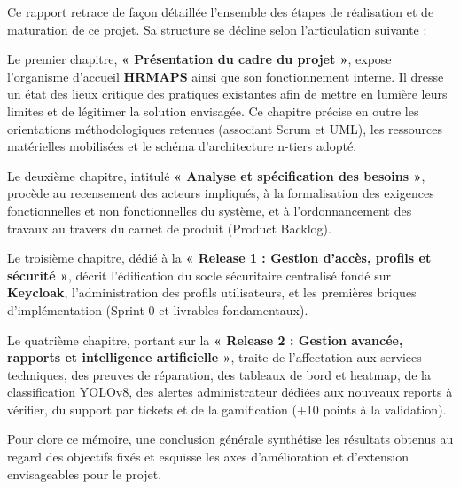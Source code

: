 Ce rapport retrace de façon détaillée l'ensemble des étapes de réalisation et de maturation de ce projet. Sa structure se décline selon l'articulation suivante :

Le premier chapitre, \textbf{« Présentation du cadre du projet »}, expose l'organisme d'accueil \textbf{HRMAPS} ainsi que son fonctionnement interne. Il dresse un état des lieux critique des pratiques existantes afin de mettre en lumière leurs limites et de légitimer la solution envisagée. Ce chapitre précise en outre les orientations méthodologiques retenues (associant Scrum et UML), les ressources matérielles mobilisées et le schéma d'architecture n-tiers adopté.

Le deuxième chapitre, intitulé \textbf{« Analyse et spécification des besoins »}, procède au recensement des acteurs impliqués, à la formalisation des exigences fonctionnelles et non fonctionnelles du système, et à l'ordonnancement des travaux au travers du carnet de produit (Product Backlog).

Le troisième chapitre, dédié à la \textbf{« Release 1 : Gestion d'accès, profils et sécurité »}, décrit l'édification du socle sécuritaire centralisé fondé sur \textbf{Keycloak}, l'administration des profils utilisateurs, et les premières briques d'implémentation (Sprint 0 et livrables fondamentaux).

Le quatrième chapitre, portant sur la \textbf{« Release 2 : Gestion avancée, rapports et intelligence artificielle »}, traite de l'affectation aux services techniques, des preuves de réparation, des tableaux de bord et heatmap, de la classification YOLOv8, des alertes administrateur dédiées aux nouveaux reports à vérifier, du support par tickets et de la gamification (+10 points à la validation).

Pour clore ce mémoire, une conclusion générale synthétise les résultats obtenus au regard des objectifs fixés et esquisse les axes d'amélioration et d'extension envisageables pour le projet.

